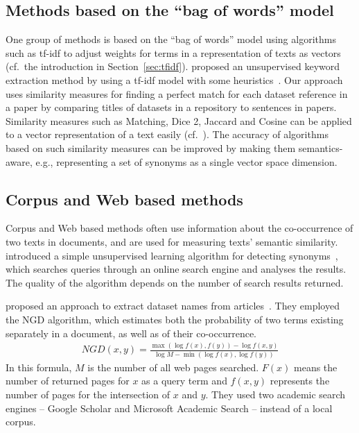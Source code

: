 \documentclass{IOS-Book-Article}
\begin{document}
\subsection{Methods based on the “bag of words” model}
One group of methods is based on the “bag of words” model using algorithms such as tf-idf to adjust weights for terms in a representation of texts as vectors (cf.\ the introduction in Section~\ref{sec:tfidf}).
\citeauthor{Lee2008} proposed an unsupervised keyword extraction method by using a tf-idf model with some heuristics~\citeyearpar{Lee2008}.
Our approach uses similarity measures for finding a perfect match for each dataset reference in a paper by comparing titles of datasets in a repository to sentences in papers.
Similarity measures such as Matching, Dice 2, Jaccard and Cosine can be applied to a vector representation of a text easily (cf.~\citet{ChristopherD1999}).
The accuracy of algorithms based on such similarity measures can be improved by making them semantics-aware, e.g., representing a set of synonyms as a single vector space dimension.

\subsection{Corpus and Web based methods}
Corpus and Web based methods often use information about the co-occurrence of two texts in documents, and are used for measuring texts' semantic similarity.
\citeauthor{Turney2001} introduced a simple unsupervised learning algorithm for detecting synonyms~\citeyearpar{Turney2001}, which searches queries through an online search engine and analyses the results.
The quality of the algorithm depends on the number of search results returned.  

\citeauthor{sighal2013} proposed an approach to extract dataset names from articles~\citeyearpar{sighal2013}.
They employed the NGD %
algorithm, which estimates both the probability of two terms existing separately in a document, as well as of their co-occurrence. 
\begin{align*}
	\mathit{NGD}(x,y)=\frac{\max(\log f(x),f(y))-\log f(x,y)}{\log M -\min(\log f(x),\log f(y))}
\end{align*}
In this formula, $M$ is the number of all web pages searched.
$F(x)$ means the number of returned pages for $x$ as a query term and $f(x,y)$ represents the number of pages for the intersection of $x$ and $y$. 
They used two academic search engines -- Google Scholar and Microsoft Academic Search -- instead of a local corpus.
\end{document}
